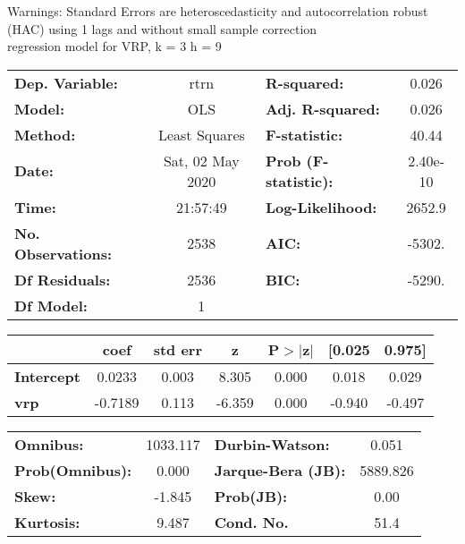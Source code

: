 Warnings: \newline
 [1] Standard Errors are heteroscedasticity and autocorrelation robust (HAC) using 1 lags and without small sample correction\\ 

regression model for VRP, k = 3 h = 9\begin{center}
\begin{tabular}{lclc}
\toprule
\textbf{Dep. Variable:}    &       rtrn       & \textbf{  R-squared:         } &     0.026   \\
\textbf{Model:}            &       OLS        & \textbf{  Adj. R-squared:    } &     0.026   \\
\textbf{Method:}           &  Least Squares   & \textbf{  F-statistic:       } &     40.44   \\
\textbf{Date:}             & Sat, 02 May 2020 & \textbf{  Prob (F-statistic):} &  2.40e-10   \\
\textbf{Time:}             &     21:57:49     & \textbf{  Log-Likelihood:    } &    2652.9   \\
\textbf{No. Observations:} &        2538      & \textbf{  AIC:               } &    -5302.   \\
\textbf{Df Residuals:}     &        2536      & \textbf{  BIC:               } &    -5290.   \\
\textbf{Df Model:}         &           1      & \textbf{                     } &             \\
\bottomrule
\end{tabular}
\begin{tabular}{lcccccc}
                   & \textbf{coef} & \textbf{std err} & \textbf{z} & \textbf{P$> |$z$|$} & \textbf{[0.025} & \textbf{0.975]}  \\
\midrule
\textbf{Intercept} &       0.0233  &        0.003     &     8.305  &         0.000        &        0.018    &        0.029     \\
\textbf{vrp}       &      -0.7189  &        0.113     &    -6.359  &         0.000        &       -0.940    &       -0.497     \\
\bottomrule
\end{tabular}
\begin{tabular}{lclc}
\textbf{Omnibus:}       & 1033.117 & \textbf{  Durbin-Watson:     } &    0.051  \\
\textbf{Prob(Omnibus):} &   0.000  & \textbf{  Jarque-Bera (JB):  } & 5889.826  \\
\textbf{Skew:}          &  -1.845  & \textbf{  Prob(JB):          } &     0.00  \\
\textbf{Kurtosis:}      &   9.487  & \textbf{  Cond. No.          } &     51.4  \\
\bottomrule
\end{tabular}
\end{center}

